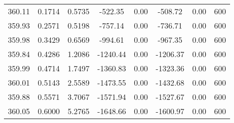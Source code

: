 \documentclass[%
 aip,
 jcp,
 sd,%
 amsmath,amssymb,
]{revtex4-1}
\begin{document}
\begin{table*}[!htbp]
\begin{ruledtabular}
\begin{tabular}{cccccccc}
360.11	&	0.1714	&	0.5735	&	-522.35	&	0.00	&	-508.72	&	0.00	&	600	\\
359.93	&	0.2571	&	0.5198	&	-757.14	&	0.00	&	-736.71	&	0.00	&	600	\\
359.98	&	0.3429	&	0.6569	&	-994.61	&	0.00	&	-967.35	&	0.00	&	600	\\
359.84	&	0.4286	&	1.2086	&	-1240.44	&	0.00	&	-1206.37	&	0.00	&	600	\\
359.99	&	0.4714	&	1.7497	&	-1360.83	&	0.00	&	-1323.36	&	0.00	&	600	\\
360.01	&	0.5143	&	2.5589	&	-1473.55	&	0.00	&	-1432.68	&	0.00	&	600	\\
359.88	&	0.5571	&	3.7067	&	-1571.94	&	0.00	&	-1527.67	&	0.00	&	600	\\
360.05	&	0.6000	&	5.2765	&	-1648.66	&	0.00	&	-1600.97	&	0.00	&	600	\\
\end{tabular}
\end{ruledtabular}
\end{table*}
\end{document}
